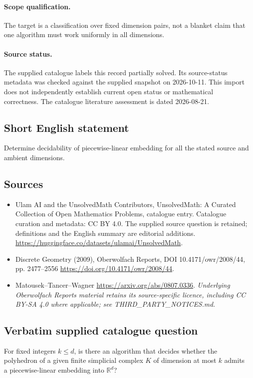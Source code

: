 \documentclass[11pt]{article}
\begin{document}
\paragraph{Scope qualification.}
The target is a classification over fixed dimension pairs, not a blanket claim that one algorithm must work uniformly in all dimensions.
\paragraph{Source status.}
The supplied catalogue labels this record partially solved. Its source-status metadata was checked against the supplied snapshot on 2026-10-11. This import does not independently establish current open status or mathematical correctness. The catalogue literature assessment is dated 2026-08-21.
\subsection{Short English statement}
Determine decidability of piecewise-linear embedding for all the stated source and ambient dimensions.
\subsection{Sources}
\begin{itemize}
\item[S1] Ulam AI and the UnsolvedMath Contributors, UnsolvedMath: A Curated Collection of Open Mathematics Problems, catalogue entry. Catalogue curation and metadata: CC BY 4.0. The supplied source question is retained; definitions and the English summary are editorial additions.
\url{https://huggingface.co/datasets/ulamai/UnsolvedMath}.
\item[S2] Discrete Geometry (2009), Oberwolfach Reports, DOI 10.4171/owr/2008/44, pp. 2477--2556
\url{https://doi.org/10.4171/owr/2008/44}.
\item[S3] Matousek--Tancer--Wagner
\url{https://arxiv.org/abs/0807.0336}.
\textit{Underlying Oberwolfach Reports material retains its source-specific licence, including CC BY-SA 4.0 where applicable; see THIRD\_PARTY\_NOTICES.md.}
\end{itemize}
\subsection{Verbatim supplied catalogue question}
For fixed integers $k\leq d$, is there an algorithm that decides whether the polyhedron of a given finite simplicial complex $K$ of dimension at most $k$ admits a piecewise-linear embedding into $\mathbb R^d$?
\end{document}
